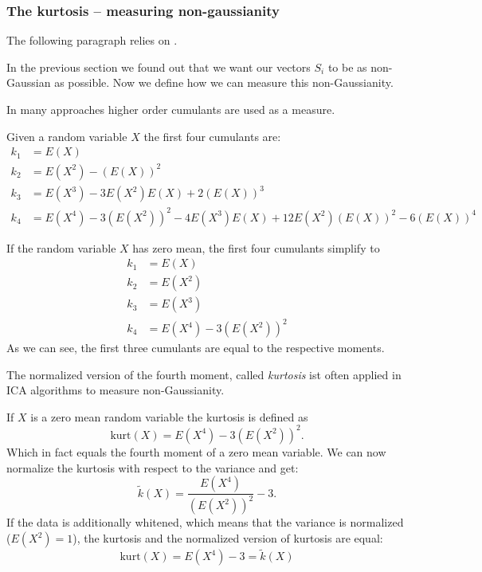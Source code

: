 \documentclass[12pt, a4paper]{article}
\numberwithin{equation}{section}
\numberwithin{figure}{section}
\numberwithin{table}{section}
\newcommand{\kurt}{\mathrm{kurt}}
\begin{document}
	\subsubsection{The kurtosis -- measuring non-gaussianity} \label{kurtosis}
	
	The following paragraph relies on \citet{ICA_Book}. 
	
	In the previous section we found out that we want our vectors \mbox{$S_i$} to be as non-Gaussian as possible.
	Now we define how we can measure this non-Gaussianity.
	
	In many approaches higher order cumulants are used as a measure.
	
	Given a random variable $X$ the first four cumulants are:
	\begin{equation}
	\begin{split}
	k_1 &= E(X)\\
	k_2 &= E(X^2)-(E(X))^2\\
	k_3 &= E(X^3)-3E(X^2)E(X)+2(E(X))^3\\
	k_4 &= E(X^4)-3(E(X^2))^2-4E(X^3)E(X)+12E(X^2)(E(X))^2-6(E(X))^4
	\end{split}
	\end{equation}
	
	If the random variable $X$ has zero mean, the first four cumulants simplify to
	\begin{equation}
	\begin{split}
	k_1 &= E(X)\\
	k_2 &= E(X^2)\\
	k_3 &= E(X^3)\\
	k_4 &= E(X^4)-3(E(X^2))^2
	\end{split}
	\end{equation}
	As we can see, the first three cumulants are equal to the respective moments.
	
	The normalized version of the fourth moment, called \textit{kurtosis} ist often applied in ICA algorithms to measure non-Gaussianity.
	
	If $X$ is a zero mean random variable the kurtosis is defined as
	\begin{equation}
	\kurt (X) = E(X^4)-3(E(X^2))^2.
	\end{equation}
	Which in fact equals the fourth moment of a zero mean variable.
	We can now normalize the kurtosis with respect to the variance and get:
	\begin{equation}
	\tilde{k}(X) = \frac{E(X^4)}{(E(X^2))^2}-3.
	\end{equation}
	If the data is additionally whitened, which means that the variance is normalized %
	\mbox{($E(X^2)=1$)}, the kurtosis and the normalized version of kurtosis are equal:
	\begin{equation}
	\kurt (X) = E(X^4)-3 =\tilde{k}(X)
	\end{equation}
	
\end{document}
